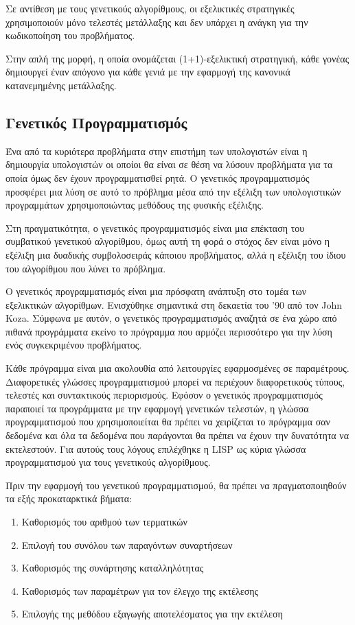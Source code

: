 Σε αντίθεση με τους γενετικούς αλγορίθμους, οι εξελικτικές στρατηγικές χρησιμοποιούν μόνο τελεστές μετάλλαξης και δεν υπάρχει η ανάγκη για την κωδικοποίηση του προβλήματος.

Στην απλή της μορφή, η οποία ονομάζεται (1+1)-εξελικτική στρατηγική, κάθε γονέας δημιουργεί έναν απόγονο για κάθε γενιά με την εφαρμογή της κανονικά κατανεμημένης μετάλλαξης.
\subsection{Γενετικός Προγραμματισμός}

Ένα από τα κυριότερα προβλήματα στην επιστήμη των υπολογιστών είναι η δημιουργία υπολογιστών οι οποίοι θα είναι σε θέση να λύσουν προβλήματα για τα οποία όμως δεν έχουν προγραμματισθεί ρητά. Ο γενετικός προγραμματισμός προσφέρει μια λύση σε αυτό το πρόβλημα μέσα από την εξέλιξη των υπολογιστικών προγραμμάτων χρησιμοποιώντας μεθόδους της φυσικής εξέλιξης.

Στη πραγματικότητα, ο γενετικός προγραμματισμός είναι μια επέκταση του συμβατικού γενετικού αλγορίθμου, όμως αυτή τη φορά ο στόχος δεν είναι μόνο η εξέλιξη μια δυαδικής συμβολοσειράς κάποιου προβλήματος, αλλά η εξέλιξη του ίδιου του αλγορίθμου που λύνει το πρόβλημα.

Ο γενετικός προγραμματισμός είναι μια πρόσφατη ανάπτυξη στο τομέα των εξελικτικών αλγορίθμων. Ενισχύθηκε σημαντικά στη δεκαετία του '90 από τον John Koza.
Σύμφωνα με αυτόν, ο γενετικός προγραμματισμός αναζητά σε ένα χώρο από πιθανά προγράμματα εκείνο το πρόγραμμα που αρμόζει περισσότερο για την λύση ενός συγκεκριμένου προβλήματος.

Κάθε πρόγραμμα είναι μια ακολουθία από λειτουργίες εφαρμοσμένες σε παραμέτρους. Διαφορετικές γλώσσες προγραμματισμού μπορεί να περιέχουν διαφορετικούς τύπους, τελεστές και συντακτικούς περιορισμούς. Εφόσον ο γενετικός προγραμματισμός παραποιεί τα προγράμματα με την εφαρμογή γενετικών τελεστών, η γλώσσα προγραμματισμού που χρησιμοποιείται θα πρέπει να χειρίζεται το πρόγραμμα σαν δεδομένα και όλα τα δεδομένα που παράγονται θα πρέπει να έχουν την δυνατότητα να εκτελεστούν. Για αυτούς τους λόγους επιλέχθηκε η LISP ως κύρια γλώσσα προγραμματισμού για τους γενετικούς αλγορίθμους.

Πριν την εφαρμογή του γενετικού προγραμματισμού, θα πρέπει να πραγματοποιηθούν τα εξής προκαταρκτικά βήματα:

\begin{enumerate}
  \item Καθορισμός του αριθμού των τερματικών
  \item Επιλογή του συνόλου των παραγόντων συναρτήσεων
  \item Καθορισμός της συνάρτησης καταλληλότητας
  \item Καθορισμός των παραμέτρων για τον έλεγχο της εκτέλεσης
  \item Επιλογής της μεθόδου εξαγωγής αποτελέσματος για την εκτέλεση
\end{enumerate}

